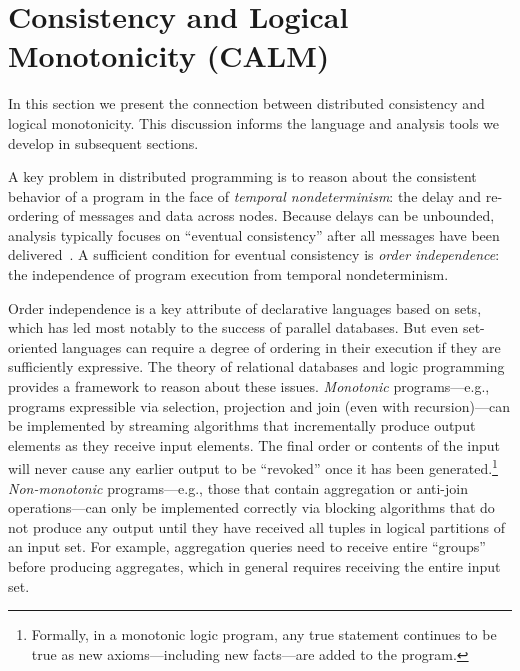 \section{Consistency and Logical \\ Monotonicity (CALM)}
\label{sec:calm}
In this section we present the connection between distributed consistency and logical monotonicity.  This discussion informs the language and analysis tools we develop in subsequent sections.

A key problem in distributed programming is to reason about the consistent behavior of a program in the face of {\em
temporal nondeterminism}: the delay and re-ordering of messages and data across
nodes.  Because delays can be unbounded, analysis typically focuses on ``eventual consistency'' after all messages have been delivered~\cite{vogels}.  A sufficient condition for eventual consistency is {\em order independence}: the independence of program execution from temporal
nondeterminism.

Order independence is a key attribute of declarative languages based on sets, which has led most notably to the success of parallel databases.  But even set-oriented languages can require a degree of ordering in their execution if they are sufficiently expressive.
The theory of relational databases and logic programming provides a framework to reason about these issues. \emph{Monotonic} programs---e.g., programs expressible via selection, projection and join (even with recursion)---can be implemented by streaming algorithms that incrementally produce output elements as they receive input elements. The final order or contents of the input will never cause any earlier output to be ``revoked'' once it has been generated.\footnote{Formally, in a monotonic logic program, any true statement continues to be true as new axioms---including new facts---are added to the program.}   
\emph{Non-monotonic} programs---e.g., those that contain aggregation or anti-join operations---can only be implemented correctly via blocking algorithms that do not produce any output until they have received all tuples in logical partitions of an input set. 
For example, aggregation queries need to receive entire ``groups'' before producing aggregates, which in general requires receiving the entire input set.

